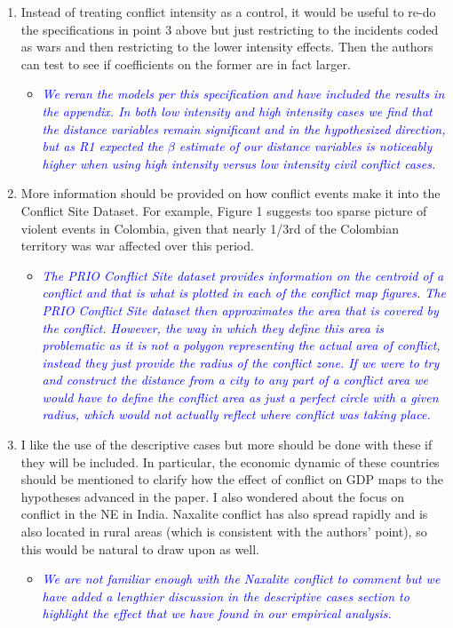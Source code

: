 \begin{enumerate}
\item Instead of treating conflict intensity as a control, it would be useful to re-do the specifications in point 3 above but just restricting to the incidents coded as wars and then restricting to the lower intensity effects. Then the authors can test to see if coefficients on the former are in fact larger.

\begin{itemize}
\item \textcolor{blue}{\emph{
	We reran the models per this specification and have included the results in the appendix. In both low intensity and high intensity cases we find that the distance variables remain significant and in the hypothesized direction, but as R1 expected the $\beta$ estimate of our distance variables is noticeably higher when using high intensity versus low intensity civil conflict cases. 
}}
\end{itemize}

\item More information should be provided on how conflict events make it into the Conflict Site Dataset. For example, Figure 1 suggests too sparse picture of violent events in Colombia, given that nearly 1/3rd of the Colombian territory was war affected over this period.

\begin{itemize}
\item \textcolor{blue}{\emph{
	The PRIO Conflict Site dataset provides information on the centroid of a conflict and that is what is plotted in each of the conflict map figures. The PRIO Conflict Site dataset then approximates the area that is covered by the conflict. However, the way in which they define this area is problematic as it is not a polygon representing the actual area of conflict, instead they just provide the radius of the conflict zone. If we were to try and construct the distance from a city to any part of a conflict area we would have to define the conflict area as just a perfect circle with a given radius, which would not actually reflect where conflict was taking place. 
}}
\end{itemize}

\item I like the use of the descriptive cases but more should be done with these if they will be included. In particular, the economic dynamic of these countries should be mentioned to clarify how the effect of conflict on GDP maps to the hypotheses advanced in the paper. I also wondered about the focus on conflict in the NE in India. Naxalite conflict has also spread rapidly and is also located in rural areas (which is consistent with the authors’ point), so this would be natural to draw upon as well.

\begin{itemize}
\item \textcolor{blue}{\emph{
	We are not familiar enough with the Naxalite conflict to comment but we have added a lengthier discussion in the descriptive cases section to highlight the effect that we have found in our empirical analysis.
}}
\end{itemize}

\end{enumerate}